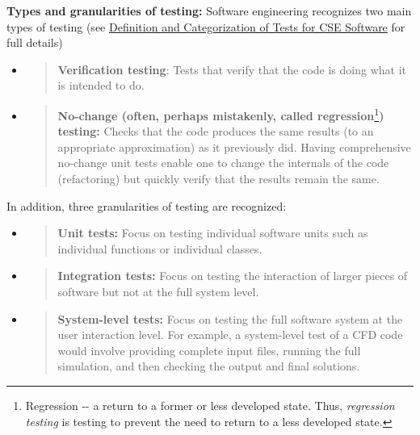 \documentclass[]{article}
\begin{document}
\textbf{Types and granularities of testing:} Software engineering
recognizes two main types of testing (see
\href{http://ideas-productivity.org/resources/howtos/ideas-testing-definitions/}{Definition
and Categorization of Tests for CSE Software} for full details)

\begin{itemize}
\item
  \begin{quote}
  \textbf{Verification testing}: Tests that verify that the code is
  doing what it is intended to do.
  \end{quote}
\item
  \begin{quote}
  \textbf{No-change (often, perhaps mistakenly, called
  regression}\footnote{Regression -\/- a return to a former or less
    developed state. Thus, \emph{regression testing} is testing to
    prevent the need to return to a less developed state.}\textbf{)
  testing:} Checks that the code produces the same results (to an
  appropriate approximation) as it previously did. Having comprehensive
  no-change unit tests enable one to change the internals of the code
  (refactoring) but quickly verify that the results remain the same.
  \end{quote}
\end{itemize}

In addition, three granularities of testing are recognized:

\begin{itemize}
\item
  \begin{quote}
  \textbf{Unit tests:} Focus on testing individual software units such
  as individual functions or individual classes.
  \end{quote}
\item
  \begin{quote}
  \textbf{Integration tests:} Focus on testing the interaction of larger
  pieces of software but not at the full system level.
  \end{quote}
\item
  \begin{quote}
  \textbf{System-level tests:} Focus on testing the full software system
  at the user interaction level. For example, a system-level test of a
  CFD code would involve providing complete input files, running the
  full simulation, and then checking the output and final solutions.
  \end{quote}
\end{itemize}
\end{document}

